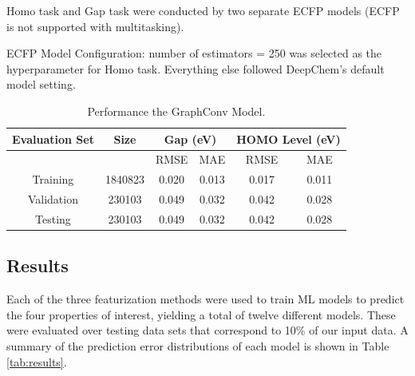 \documentclass[book.tex]{subfiles}
\begin{document}
Homo task and Gap task were conducted by two separate ECFP models (ECFP is not supported with multitasking). 

ECFP Model Configuration: number of estimators = 250 was selected as the hyperparameter for Homo task. Everything else followed DeepChem’s default model setting.

\begin{table}[!htbp]
\centering
\caption{Performance the GraphConv Model.}
\begin{tabular}{*6c}
\toprule
Evaluation Set  & Size &  \multicolumn{2}{c}{Gap (eV)} & \multicolumn{2}{c}{HOMO Level (eV)}\\
\midrule
     &    & RMSE    & MAE   & RMSE & MAE\\
\midrule
Training&1840823    &  0.020 & 0.013    & 0.017
   &  0.011\\
Validation& 230103   &  0.049 & 0.032   & 0.042  & 0.028\\
Testing& 230103   &  0.049 & 0.032   &  0.042  & 0.028\\
\bottomrule
\end{tabular}
\end{table}

\subsection{Results}
Each of the three featurization methods were used to train ML models to predict the four properties of interest, yielding a total of twelve different models. These were evaluated over testing data sets that correspond to 10\% of our input data. A summary of the prediction error distributions of each model is shown in Table \ref{tab:results}.  





\end{document}
